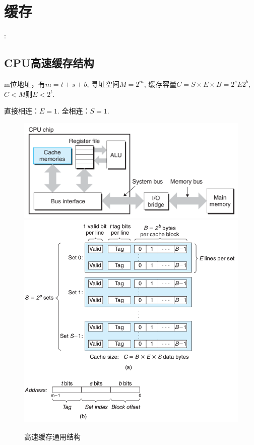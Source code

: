  
\section{缓存}
\cite{wikipedia}:

\subsection{CPU高速缓存结构}
m位地址，有$m=t+s+b$, 寻址空间$M=2^m$, 缓存容量$C=S \times E \times B=2^s E 2^b$, $C<M$则$E < 2^t$.

直接相连：$E=1$.
全相连：$S=1$.


\begin{figure}[ht]
	\begin{center}
	\includegraphics[keepaspectratio,width=0.3\paperwidth]{Pictures/cacheBus.png}
		\includegraphics[keepaspectratio,width=0.3\paperwidth]{Pictures/cache.png}
	\caption{高速缓存通用结构}
	\label{fig:cacheMemStructure}
	\end{center}
\end{figure}


